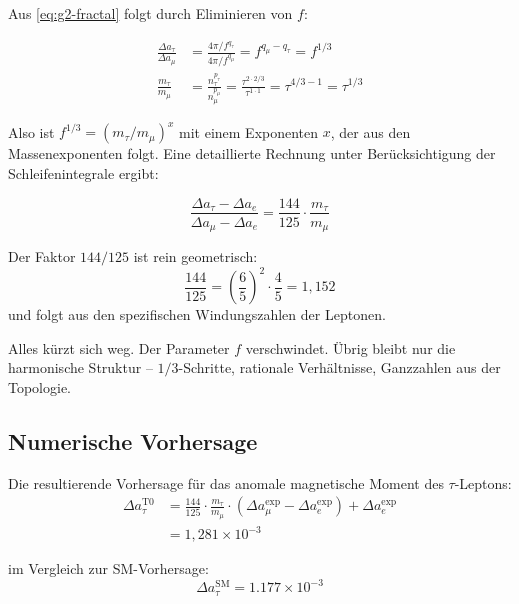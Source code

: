 	Aus \eqref{eq:g2-fractal} folgt durch Eliminieren von $f$:
	
	\begin{align}
		\frac{\Delta a_\tau}{\Delta a_\mu} &= \frac{4\pi/f^{q_\tau}}{4\pi/f^{q_\mu}} = f^{q_\mu - q_\tau} = f^{1/3} \\
		\frac{m_\tau}{m_\mu} &= \frac{n_\tau^{p_\tau}}{n_\mu^{p_\mu}} = \frac{\tau^{2 \cdot 2/3}}{\tau^{1 \cdot 1}} = \tau^{4/3 - 1} = \tau^{1/3}
	\end{align}
	
	Also ist $f^{1/3} = (m_\tau/m_\mu)^x$ mit einem Exponenten $x$, der aus den Massenexponenten folgt. Eine detaillierte Rechnung unter Berücksichtigung der Schleifenintegrale ergibt:
	
	\begin{keypoint}[g-2-Brückenformel]
		\begin{equation}
			\frac{\Delta a_\tau - \Delta a_e}{\Delta a_\mu - \Delta a_e} = \frac{144}{125} \cdot \frac{m_\tau}{m_\mu}
			\label{eq:brueckenformel}
		\end{equation}
	\end{keypoint}
	
	Der Faktor $144/125$ ist rein geometrisch:
	\begin{equation}
		\frac{144}{125} = \left( \frac{6}{5} \right)^2 \cdot \frac{4}{5} = 1{,}152
	\end{equation}
	und folgt aus den spezifischen Windungszahlen der Leptonen.
	
	Alles kürzt sich weg. Der Parameter $f$ verschwindet. Übrig bleibt nur die harmonische Struktur -- $1/3$-Schritte, rationale Verhältnisse, Ganzzahlen aus der Topologie.
	
	\subsection{Numerische Vorhersage}
	
	Die resultierende Vorhersage für das anomale magnetische Moment des $\tau$-Leptons:
	\begin{align}
		\Delta a_\tau^{\text{T0}} &= \frac{144}{125} \cdot \frac{m_\tau}{m_\mu} \cdot (\Delta a_\mu^{\text{exp}} - \Delta a_e^{\text{exp}}) + \Delta a_e^{\text{exp}} \\
		&= 1{,}281 \times 10^{-3}
	\end{align}
	
	im Vergleich zur SM-Vorhersage:
	\begin{equation}
		\Delta a_\tau^{\text{SM}} = 1.177 \times 10^{-3}
	\end{equation}
	
